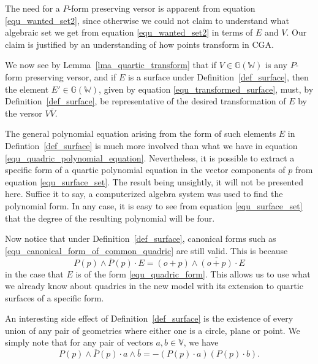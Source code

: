\documentclass{birkjour}
\theoremstyle{definition}
\theoremstyle{remark}
\numberwithin{equation}{section}
\newcommand{\G}{\mathbb{G}}
\newcommand{\V}{\mathbb{V}}
\newcommand{\W}{\mathbb{W}}
\newcommand{\nvao}{o}
\begin{document}
The need for a $P$-form preserving versor is apparent from equation
\eqref{equ_wanted_set2}, since otherwise we could not claim to understand what
algebraic set we get from equation \eqref{equ_wanted_set2} in terms of $E$ and $V$.
Our claim is justified by an understanding of how points transform in CGA.

We now see by Lemma~\ref{lma_quartic_transform}
that if $V\in\G(\W)$ is any $P$-form preserving versor, and if $E$
is a surface under Definition~\ref{def_surface}, then the element $E'\in\G(\W)$,
given by equation \eqref{equ_transformed_surface}, must, by Definition~\ref{def_surface},
be representative of the desired transformation of $E$ by the versor $V\overline{V}$.

The general polynomial equation arising from the form of
such elements $E$ in Defintion~\ref{def_surface} is much more involved than
what we have in equation \eqref{equ_quadric_polynomial_equation}.  Nevertheless, it is possible to extract
a specific form of a quartic polynomial equation in
the vector components of $p$ from equation \eqref{equ_surface_set}.
The result being unsightly, it will not be presented here.  Suffice it to say, a computerized
algebra system was used to find the polynomial form.  In any case, it is easy
to see from equation \eqref{equ_surface_set} that the degree of the resulting
polynomial will be four.

Now notice that under Definition~\ref{def_surface}, canonical forms
such as \eqref{equ_canonical_form_of_common_quadric} are still valid.
This is because
\begin{equation}
P(p)\wedge\overline{P}(p)\cdot E = (\nvao+p)\wedge\overline{(\nvao+p)}\cdot E
\end{equation}
in the case that $E$ is of the form \eqref{equ_quadric_form}.  This allows
us to use what we already know about quadrics in the new model with its extension to
quartic surfaces of a specific form.

An interesting side effect of Definition~\ref{def_surface} is the existence
of every union of any pair of geometries where either one is a circle, plane
or point.  We simply note that for any pair of vectors $a,b\in\V$, we have
\begin{equation}
P(p)\wedge\overline{P}(p)\cdot a\wedge\overline{b} = -(P(p)\cdot a)(P(p)\cdot b).
\end{equation}
\end{document}
